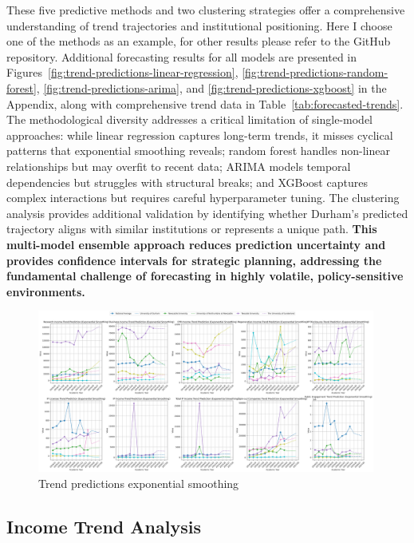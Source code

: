 \documentclass[journal,onecolumn, 10pt,draftclsnofoot]{IEEEtran}
\begin{document}
These five predictive methods and two clustering strategies offer a comprehensive understanding of trend trajectories and institutional positioning. Here I choose one of the methods as an example, for other results please refer to the GitHub repository. Additional forecasting results for all models are presented in Figures~\ref{fig:trend-predictions-linear-regression}, \ref{fig:trend-predictions-random-forest}, \ref{fig:trend-predictions-arima}, and \ref{fig:trend-predictions-xgboost} in the Appendix, along with comprehensive trend data in Table~\ref{tab:forecasted-trends}. The methodological diversity addresses a critical limitation of single-model approaches: while linear regression captures long-term trends, it misses cyclical patterns that exponential smoothing reveals; random forest handles non-linear relationships but may overfit to recent data; ARIMA models temporal dependencies but struggles with structural breaks; and XGBoost captures complex interactions but requires careful hyperparameter tuning. The clustering analysis provides additional validation by identifying whether Durham's predicted trajectory aligns with similar institutions or represents a unique path. \textbf{This multi-model ensemble approach reduces prediction uncertainty and provides confidence intervals for strategic planning, addressing the fundamental challenge of forecasting in highly volatile, policy-sensitive environments.}


\begin{figure}[h]
\centering
\includegraphics[width=0.99\textwidth]{Fig/figure43.trend_predictions_exponential_smoothing.png}
\caption{Trend predictions exponential smoothing}
\label{fig:trend-predictions-exponential-smoothing}
\end{figure}

\subsection{Income Trend Analysis}
\end{document}
